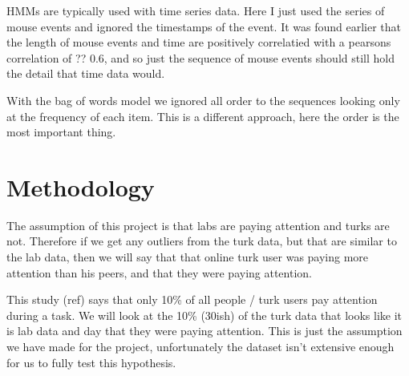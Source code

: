 \documentclass{article}
\begin{document}

HMMs are typically used with time series data.
Here I just used the series of mouse events and ignored the timestamps of the event.
It was found earlier that the length of mouse events and time are positively correlatied with a pearsons correlation of ?? 0.6,
 and so just the sequence of mouse events should still hold the detail that time data would.

With the bag of words model we ignored all order to the sequences looking only at the frequency of each item.
This is a different approach, here the order is the most important thing.


\section{Methodology}

 The assumption of this project is that labs are paying attention and turks are not. Therefore if we get any outliers from the turk data, but that are similar to the lab data, then we will say that that online turk user was paying more attention than his peers, and that they were paying attention.

This study (ref) says that only 10\% of all people / turk users pay attention during a task.
We will look at the 10\% (30ish) of the turk data that looks like it is lab data and day that they were paying attention.
This is just the assumption we have made for the project, 
unfortunately the dataset isn't extensive enough for us to fully test this hypothesis.
\end{document}
